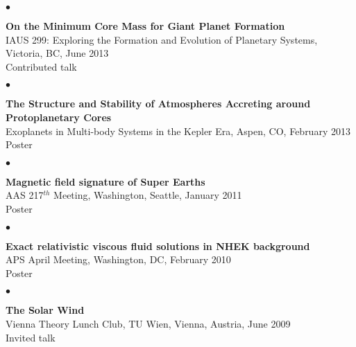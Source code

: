 \documentclass[margin,line]{res}
\newenvironment{list2}{
  \begin{list}{$\bullet$}{%
      \setlength{\itemsep}{0in}
      \setlength{\parsep}{0in} \setlength{\parskip}{0in}
      \setlength{\topsep}{0in} \setlength{\partopsep}{0in} 
      \setlength{\leftmargin}{0.2in}}}{\end{list}}
\begin{document}
\begin{resume}
\begin{list2}
\item[] {\bf On the Minimum Core Mass for Giant Planet Formation} \\
IAUS 299: Exploring the Formation and Evolution of Planetary Systems, Victoria, BC, June 2013  \\
Contributed talk \\
\end{list2}

\begin{list2}
\item[] {\bf The Structure and Stability of Atmospheres Accreting around Protoplanetary Cores} \\
Exoplanets in Multi-body Systems in the Kepler Era, Aspen, CO, February 2013 \\
Poster \\
\end{list2}

\begin{list2}
\item[] {\bf Magnetic field signature of Super Earths} \\
AAS 217$^{th}$ Meeting, Washington, Seattle, January 2011  \\
Poster \\
\end{list2}

\vspace*{-.13in}
\begin{list2}
\item[] {\bf Exact relativistic viscous fluid solutions in NHEK background} \\
APS April Meeting, Washington, DC, February 2010  \\
Poster \\
\end{list2}

\vspace*{-.13in}
\begin{list2}
\item[] {\bf The Solar Wind}\\ 
Vienna Theory Lunch Club, TU Wien, Vienna, Austria, June 2009  \\
Invited talk \\
\end{list2}


\end{resume}
\end{document}
